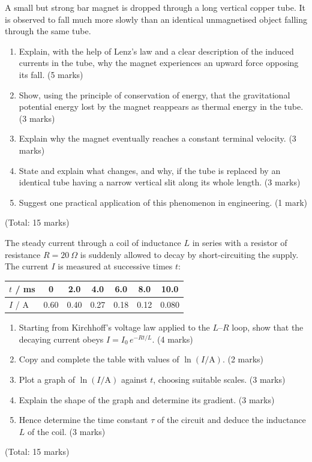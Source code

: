 \documentclass[11pt]{article}
\begin{document}
\begin{exercice}
A small but strong bar magnet is dropped through a long vertical copper tube. It is observed to fall much more slowly than an identical unmagnetised object falling through the same tube.
\begin{enumerate}
\item[(a)] Explain, with the help of Lenz's law and a clear description of the induced currents in the tube, why the magnet experiences an upward force opposing its fall. \hfill (5 marks)
\item[(b)] Show, using the principle of conservation of energy, that the gravitational potential energy lost by the magnet reappears as thermal energy in the tube. \hfill (3 marks)
\item[(c)] Explain why the magnet eventually reaches a constant terminal velocity. \hfill (3 marks)
\item[(d)] State and explain what changes, and why, if the tube is replaced by an identical tube having a narrow vertical slit along its whole length. \hfill (3 marks)
\item[(e)] Suggest one practical application of this phenomenon in engineering. \hfill (1 mark)
\end{enumerate}
\hfill (Total: 15 marks)
\end{exercice}

\begin{exercice}
The steady current through a coil of inductance $L$ in series with a resistor of resistance $R = 20\ \Omega$ is suddenly allowed to decay by short-circuiting the supply. The current $I$ is measured at successive times $t$:

\begin{center}
\begin{tabular}{|l|c|c|c|c|c|c|}
\hline
\rowcolor{popblueL} $t$ / ms & 0 & 2.0 & 4.0 & 6.0 & 8.0 & 10.0 \\
\hline
$I$ / A & 0.60 & 0.40 & 0.27 & 0.18 & 0.12 & 0.080 \\
\hline
\end{tabular}
\end{center}

\begin{enumerate}
\item[(a)] Starting from Kirchhoff's voltage law applied to the $L$--$R$ loop, show that the decaying current obeys $I = I_0\,e^{-Rt/L}$. \hfill (4 marks)
\item[(b)] Copy and complete the table with values of $\ln(I/\mathrm{A})$. \hfill (2 marks)
\item[(c)] Plot a graph of $\ln(I/\mathrm{A})$ against $t$, choosing suitable scales. \hfill (3 marks)
\item[(d)] Explain the shape of the graph and determine its gradient. \hfill (3 marks)
\item[(e)] Hence determine the time constant $\tau$ of the circuit and deduce the inductance $L$ of the coil. \hfill (3 marks)
\end{enumerate}
\hfill (Total: 15 marks)
\end{exercice}
\end{document}
